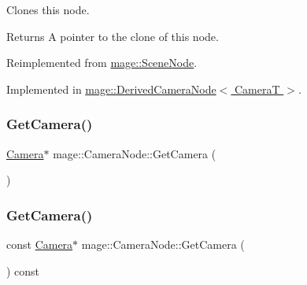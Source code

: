 Clones this node.

\begin{DoxyReturn}{Returns}
A pointer to the clone of this node. 
\end{DoxyReturn}


Reimplemented from \hyperlink{classmage_1_1_scene_node_a42d0d53ab804d38ebd584d2de6490eeb}{mage\+::\+Scene\+Node}.



Implemented in \hyperlink{classmage_1_1_derived_camera_node_aa965751029ebd6b41d3805b499a8304e}{mage\+::\+Derived\+Camera\+Node$<$ Camera\+T $>$}.

\hypertarget{classmage_1_1_camera_node_aa9887e3bf192d6c078aae2430732cbf8}{}\label{classmage_1_1_camera_node_aa9887e3bf192d6c078aae2430732cbf8} 
\subsubsection{\texorpdfstring{Get\+Camera()}{GetCamera()}\hspace{0.1cm}{\footnotesize\ttfamily [1/2]}}
{\footnotesize\ttfamily \hyperlink{classmage_1_1_camera}{Camera}$\ast$ mage\+::\+Camera\+Node\+::\+Get\+Camera (\begin{DoxyParamCaption}{ }\end{DoxyParamCaption})\hspace{0.3cm}{\ttfamily [noexcept]}}

\hypertarget{classmage_1_1_camera_node_aa911263cfce8cec2a42c6d03d25af606}{}\label{classmage_1_1_camera_node_aa911263cfce8cec2a42c6d03d25af606} 
\subsubsection{\texorpdfstring{Get\+Camera()}{GetCamera()}\hspace{0.1cm}{\footnotesize\ttfamily [2/2]}}
{\footnotesize\ttfamily const \hyperlink{classmage_1_1_camera}{Camera}$\ast$ mage\+::\+Camera\+Node\+::\+Get\+Camera (\begin{DoxyParamCaption}{ }\end{DoxyParamCaption}) const\hspace{0.3cm}{\ttfamily [noexcept]}}


